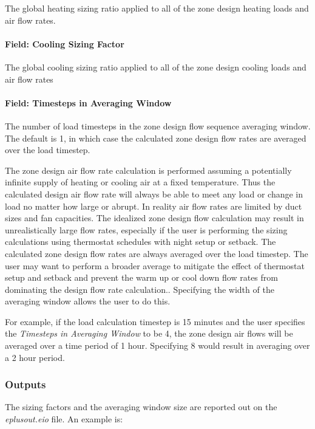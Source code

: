 The global heating sizing ratio applied to all of the zone design heating loads and air flow rates.

\paragraph{Field: Cooling Sizing Factor}\label{field-cooling-sizing-factor}

The global cooling sizing ratio applied to all of the zone design cooling loads and air flow rates

\paragraph{Field: Timesteps in Averaging Window}\label{field-timesteps-in-averaging-window}

The number of load timesteps in the zone design flow sequence averaging window. The default is 1, in which case the calculated zone design flow rates are averaged over the load timestep.

The zone design air flow rate calculation is performed assuming a potentially infinite supply of heating or cooling air at a fixed temperature. Thus the calculated design air flow rate will always be able to meet any load or change in load no matter how large or abrupt. In reality air flow rates are limited by duct sizes and fan capacities. The idealized zone design flow calculation may result in unrealistically large flow rates, especially if the user is performing the sizing calculations using thermostat schedules with night setup or setback. The calculated zone design flow rates are always averaged over the load timestep. The user may want to perform a broader average to mitigate the effect of thermostat setup and setback and prevent the warm up or cool down flow rates from dominating the design flow rate calculation.. Specifying the width of the averaging window allows the user to do this.

For example, if the load calculation timestep is 15 minutes and the user specifies the \emph{Timesteps in Averaging Window} to be 4, the zone design air flows will be averaged over a time period of 1 hour. Specifying 8 would result in averaging over a 2 hour period.

\subsubsection{Outputs}\label{outputs-009}

The sizing factors and the averaging window size are reported out on the \emph{eplusout.eio} file. An example is:


